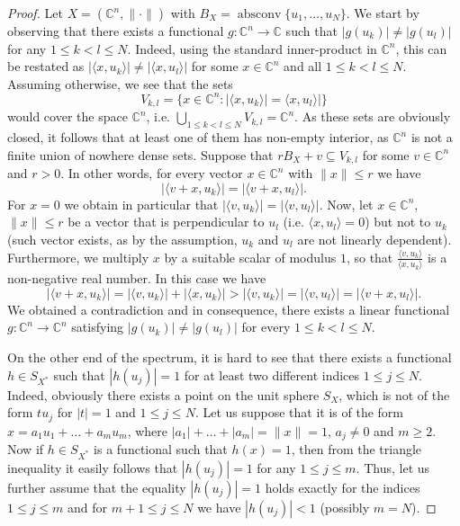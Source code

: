 \documentclass[12pt, reqno]{amsart}
\theoremstyle{definition}
\theoremstyle{remark}
\numberwithin{equation}{section}
\DeclareMathOperator{\absconv}{absconv}
\begin{document}
\begin{proof}
Let $X = (\mathbb{C}^n, \| \cdot \|)$ with $B_X = \absconv \{u_1, \ldots, u_N\}$. We start by observing that there exists a functional $g: \mathbb{C}^n \to \mathbb{C}$ such that $|g(u_k)| \neq |g(u_l)|$ for any $1 \leq k < l \leq N$. Indeed, using the standard inner-product in $\mathbb{C}^n$, this can be restated as $|\langle x, u_k \rangle | \neq |\langle x, u_l \rangle |$ for some $x \in \mathbb{C}^n$ and all $1 \leq k < l \leq N$. Assuming otherwise, we see that the sets 
$$V_{k, l} = \{ x \in \mathbb{C}^n: |\langle x, u_k \rangle | = \langle x, u_l \rangle|  \}$$
would cover the space $\mathbb{C}^n$, i.e. $\bigcup_{1 \leq k < l \leq N} V_{k, l} = \mathbb{C}^n$. As these sets are obviously closed, it follows that at least one of them has non-empty interior, as $\mathbb{C}^n$ is not a finite union of nowhere dense sets. Suppose that $rB_X + v \subseteq V_{k, l}$ for some $v \in \mathbb{C}^n$ and $r>0$. In other words, for every vector $x \in \mathbb{C}^n$ with $\|x\| \leq r$ we have
$$|\langle v+x, u_k \rangle | = |\langle v+x, u_l \rangle |.$$
For $x=0$ we obtain in particular that $| \langle v, u_k \rangle | = | \langle v, u_l \rangle |$. Now, let $x \in \mathbb{C}^n$, $\|x\| \leq r$ be a vector that is perpendicular to $u_l$ (i.e. $\langle x, u_l \rangle = 0$) but not to $u_k$ (such vector exists, as by the assumption, $u_k$ and $u_l$ are not linearly dependent). Furthermore, we multiply $x$ by a suitable scalar of modulus $1$, so that $\frac{\langle v, u_k \rangle}{\langle x, u_k \rangle}$ is a non-negative real number. In this case we have
$$ |\langle v+x, u_k \rangle | = |\langle v, u_k \rangle| + |\langle x, u_k \rangle| > |\langle v, u_k \rangle | = | \langle v, u_l \rangle| = |\langle v + x, u_l \rangle |.$$
We obtained a contradiction and in consequence, there exists a linear functional $g: \mathbb{C}^n \to \mathbb{C}^n$ satisfying $|g(u_k)| \neq |g(u_l)|$ for every $1 \leq k < l \leq N$.

On the other end of the spectrum, it is hard to see that there exists a functional $h \in S_{X^*}$ such that $|h(u_j)|=1$ for at least two different indices $1 \leq j \leq N$. Indeed, obviously there exists a point on the unit sphere $S_X$, which is not of the form $tu_j$ for $|t|=1$ and $1 \leq j \leq N$. Let us suppose that it is of the form $x=a_1u_1 + \ldots + a_mu_m$, where $|a_1| + \ldots + |a_m|=\|x\|=1$, $a_j \neq 0$ and $m \geq 2$. Now if $h \in S_{X^*}$ is a functional such that $h(x)=1$, then from the triangle inequality it easily follows that $|h(u_j)|=1$ for any $1 \leq j \leq m$. Thus, let us further assume that the equality $|h(u_j)|=1$ holds exactly for the indices $1 \leq j \leq m$ and for $m+1 \leq j \leq N$ we have $|h(u_j)|<1$ (possibly $m=N$). 


\end{proof}
\end{document}
